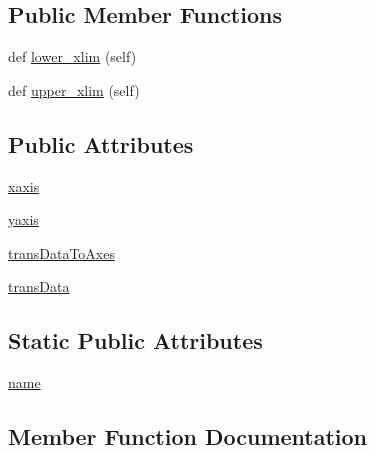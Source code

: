 \subsection*{Public Member Functions}
\begin{DoxyCompactItemize}
\item 
def \hyperlink{classmatplotlib_1_1tests_1_1test__skew_1_1SkewXAxes_acef5eda731140aad5c5f48084a95e6f3}{lower\+\_\+xlim} (self)
\item 
def \hyperlink{classmatplotlib_1_1tests_1_1test__skew_1_1SkewXAxes_a2b5a6e720ec8e6290528c63eaac9dcd2}{upper\+\_\+xlim} (self)
\end{DoxyCompactItemize}
\subsection*{Public Attributes}
\begin{DoxyCompactItemize}
\item 
\hyperlink{classmatplotlib_1_1tests_1_1test__skew_1_1SkewXAxes_a9a5761a3d115baad393a0581e1bd224b}{xaxis}
\item 
\hyperlink{classmatplotlib_1_1tests_1_1test__skew_1_1SkewXAxes_a0e7bc70ac0c34bd7472a95ade86f75a5}{yaxis}
\item 
\hyperlink{classmatplotlib_1_1tests_1_1test__skew_1_1SkewXAxes_a171ce496c4b6104a4b9347e0ca7bc525}{trans\+Data\+To\+Axes}
\item 
\hyperlink{classmatplotlib_1_1tests_1_1test__skew_1_1SkewXAxes_ade83c13d56e61329757fb12a77fd715d}{trans\+Data}
\end{DoxyCompactItemize}
\subsection*{Static Public Attributes}
\begin{DoxyCompactItemize}
\item 
\hyperlink{classmatplotlib_1_1tests_1_1test__skew_1_1SkewXAxes_a78394d3022d9b3af4812405c5325ff2e}{name}
\end{DoxyCompactItemize}


\subsection{Member Function Documentation}
\mbox{\label{classmatplotlib_1_1tests_1_1test__skew_1_1SkewXAxes_acef5eda731140aad5c5f48084a95e6f3}} 
